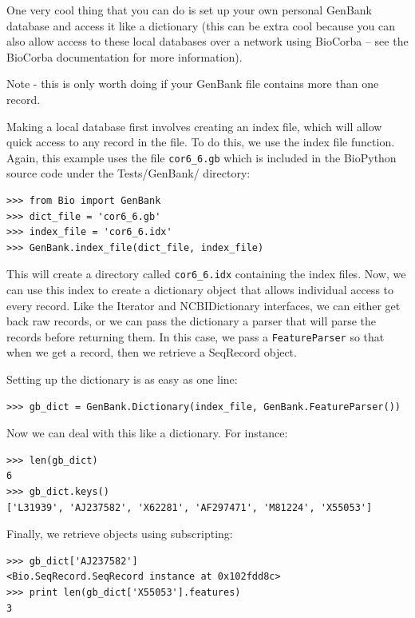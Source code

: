 \documentclass{report}
\begin{document}
One very cool thing that you can do is set up your own personal GenBank database and access it like a dictionary (this can be extra cool because you can also allow access to these local databases over a network using BioCorba -- see the BioCorba documentation for more information).

Note - this is only worth doing if your GenBank file contains more than one record.

Making a local database first involves creating an index file, which will allow quick access to any record in the file. To do this, we use the index file function.
Again, this example uses the file \verb|cor6_6.gb| which is included in the BioPython source code under the Tests/GenBank/ directory:

\begin{verbatim}
>>> from Bio import GenBank
>>> dict_file = 'cor6_6.gb'
>>> index_file = 'cor6_6.idx'
>>> GenBank.index_file(dict_file, index_file)
\end{verbatim}

This will create a directory called \verb|cor6_6.idx| containing the index files. Now, we can use this index to create a dictionary object that allows individual access to every record. Like the Iterator and NCBIDictionary interfaces, we can either get back raw records, or we can pass the dictionary a parser that will parse the records before returning them. In this case, we pass a \verb|FeatureParser| so that when we get a record, then we retrieve a SeqRecord object. 


Setting up the dictionary is as easy as one line:

\begin{verbatim}
>>> gb_dict = GenBank.Dictionary(index_file, GenBank.FeatureParser())
\end{verbatim}

Now we can deal with this like a dictionary. For instance:

\begin{verbatim}
>>> len(gb_dict)
6
>>> gb_dict.keys()
['L31939', 'AJ237582', 'X62281', 'AF297471', 'M81224', 'X55053']
\end{verbatim}

Finally, we retrieve objects using subscripting:

\begin{verbatim}
>>> gb_dict['AJ237582']
<Bio.SeqRecord.SeqRecord instance at 0x102fdd8c>
>>> print len(gb_dict['X55053'].features)
3
\end{verbatim}
\end{document}
